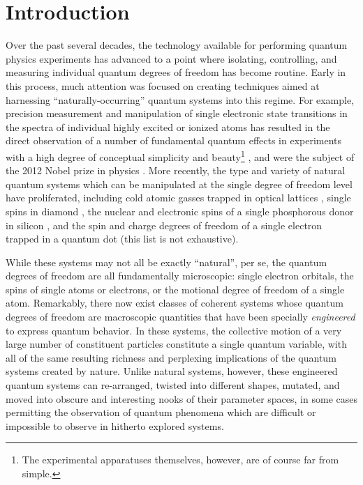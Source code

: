 \chapter{Introduction}
\label{c:intro}

Over the past several decades, the technology available for performing quantum physics experiments has advanced to a point where isolating, controlling, and measuring individual quantum degrees of freedom has become routine.  Early in this process, much attention was focused on creating techniques aimed at harnessing ``naturally-occurring'' quantum systems into this regime.  For example, precision measurement and manipulation of single electronic state transitions in the spectra of individual highly excited or ionized atoms has resulted in the direct observation of a number of fundamental quantum effects in experiments with a high degree of conceptual simplicity and beauty\footnote{The experimental apparatuses themselves, however, are of course far from simple.} \cite{PhysRevLett.65.976,PhysRevLett.72.3339,Nogues1999,Monroe24051996,Myatt2000,RevModPhys.73.565}, and were the subject of the 2012 Nobel prize in physics \cite{Nobelprize.org2012}.  More recently, the type and variety of natural quantum systems which can be manipulated at the single degree of freedom level have proliferated, including cold atomic gasses trapped in optical lattices \cite{Bloch2005}, single spins in diamond \cite{ISI:000321694300003}, the nuclear and electronic spins of a single phosphorous donor in silicon \cite{Pla2012}, and the spin and charge degrees of freedom of a single electron trapped in a quantum dot \cite{ISI:000321694300004} (this list is not exhaustive).

While these systems may not all be exactly ``natural'', per se, the quantum degrees of freedom are all fundamentally microscopic: single electron orbitals, the spins of single atoms or electrons, or the motional degree of freedom of a single atom.  Remarkably, there now exist classes of coherent systems whose quantum degrees of freedom are macroscopic quantities that have been specially \textit{engineered} to express quantum behavior.  In these systems, the collective motion of a very large number of constituent particles constitute a single quantum variable, with all of the same resulting richness and perplexing implications of the quantum systems created by nature.  Unlike natural systems, however, these engineered quantum systems can re-arranged, twisted into different shapes, mutated, and moved into obscure and interesting nooks of their parameter spaces, in some cases permitting the observation of quantum phenomena which are difficult or impossible to observe in hitherto explored systems.

